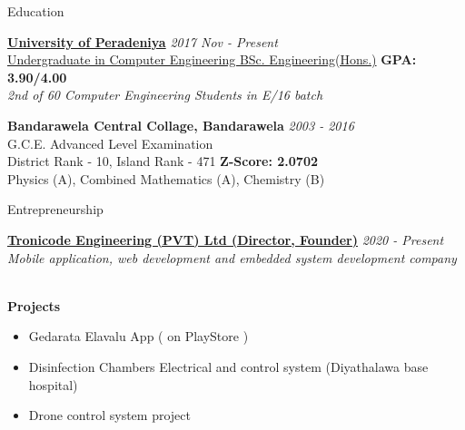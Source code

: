 \documentclass{resume} %
\begin{document}
\begin{rSection}{Education}

{\bf \href{http://eng.pdn.ac.lk}{University of Peradeniya}} \hfill {\em 2017 Nov - Present} 
\\ \href{http://www.ce.pdn.ac.lk/undergraduate-courses}{Undergraduate in Computer Engineering BSc. Engineering(Hons.)} \hfill {\bf  GPA: 3.90/4.00} 
\\ {\em 2nd of 60 Computer Engineering Students in E/16 batch}

{\bf{Bandarawela Central Collage, Bandarawela}} \hfill {\em 2003 - 2016} 
\\ G.C.E. Advanced Level Examination
\\ District Rank - 10, Island Rank - 471 \hfill {\bf  Z-Score: 2.0702}
\\ Physics (A), Combined Mathematics (A), Chemistry (B)



\end{rSection}


\begin{rSection}{Entrepreneurship}

{\bf \href{https://www.facebook.com/tronicode.engineering}{Tronicode Engineering (PVT) Ltd (Director, Founder)}} \hfill {\em 2020 - Present} 
\\ {\em Mobile application, web development and embedded system development company}


\\ {\bf Projects}
\begin{itemize}
\item {Gedarata Elavalu App ( on PlayStore )}
\item {Disinfection Chambers Electrical and control system (Diyathalawa base hospital)}
\item {Drone control system project}
\end{itemize}

\end{rSection}
\end{document}
